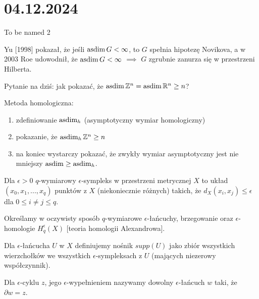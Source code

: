 \section{04.12.2024}{To be named 2}

Yu [1998] pokazał, że jeśli $\operatorname{asdim} G<\infty$, to $G$ spełnia hipotezę Novikova, a w 2003 Roe udowodnił, że $\operatorname{asdim} G<\infty$ $\implies$ $G$ zgrubnie zanurza się w przestrzeni Hilberta.

Pytanie na dziś: jak pokazać, że $\operatorname{asdim}\mathbb{Z}^n=\operatorname{asdim}\mathbb{R}^n\geq n$?

Metoda homologiczna:
\begin{enumerate}
  \item zdefiniowanie $\operatorname{asdim}_h$ (asymptotyczny wymiar homologiczny)
  \item pokazanie, że $\operatorname{asdim}_h\mathbb{Z}^n\geq n$
  \item na koniec wystarczy pokazać, że zwykły wymiar asymptotyczny jest nie mniejszy $\operatorname{asdim} \geq \operatorname{asdim}_h$.
\end{enumerate}

\begin{definition}{}{}
  Dla $\epsilon>0$ $q$-wymiarowy $\epsilon$-sympleks w przestrzeni metrycznej $X$ to układ $(x_0,x_1,...,x_q)$ punktów z $X$ (niekoniecznie różnych) takich, że $d_X(x_i, x_j)\leq\epsilon$ dla $0\leq i\neq j\leq q$.
\end{definition}

Określamy w oczywisty sposób $q$-wymiarowe $\epsilon$-łańcuchy, brzegowanie oraz $\epsilon$-homologie $H_q^\epsilon(X)$ [teoria homologii Alexandrowa].

Dla $\epsilon$-łańcucha $U$ w $X$ definiujemy nośnik $supp(U)$ jako zbiór wszystkich wierzchołków we wszystkich $\epsilon$-sympleksach z $U$ (mających niezerowy współczynnik).

Dla $\epsilon$-cyklu $z$, jego $\epsilon$-wypełnieniem nazywamy dowolny $\epsilon$-łańcuch $w$ taki, że $\partial w=z$.


\begin{center}
\end{center}


